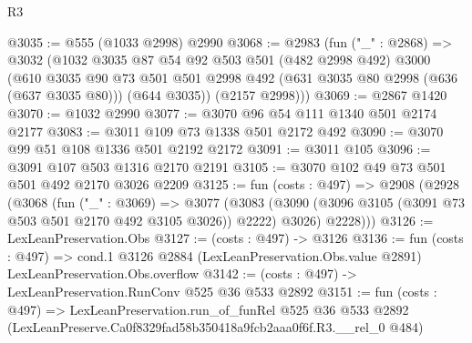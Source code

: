 \begin{lexlean}{R3}
\begin{coremodule}
@3035 := @555 (@1033 @2998) @2990
@3068 := @2983
    (fun ("_" : @2868) =>
    @3032
      (@1032
        @3035
        @87
        @54
        @92
        @503
        @501
        (@482 @2998 @492)
        @3000
        (@610
          @3035
          @90
          @73
          @501
          @501
          @2998
          @492
          (@631 @3035 @80 @2998 (@636 (@637 @3035 @80)))
          (@644 @3035))
        (@2157 @2998)))
@3069 := @2867 @1420
@3070 := @1032 @2990
@3077 := @3070 @96 @54 @111 @1340 @501 @2174 @2177
@3083 := @3011 @109 @73 @1338 @501 @2172 @492
@3090 := @3070 @99 @51 @108 @1336 @501 @2192 @2172
@3091 := @3011 @105
@3096 := @3091 @107 @503 @1316 @2170 @2191
@3105 := @3070 @102 @49 @73 @501 @501 @492 @2170 @3026 @2209
@3125 := fun (costs : @497) =>
  @2908
    (@2928
      (@3068
        (fun ("_" : @3069) =>
        @3077
          (@3083 (@3090 (@3096 @3105 (@3091 @73 @503 @501 @2170 @492 @3105 @3026)) @2222) @3026)
          @2228)))
@3126 := LexLeanPreservation.Obs
@3127 := (costs : @497) -> @3126
@3136 := fun (costs : @497) =>
  cond.{1} @3126 @2884 (LexLeanPreservation.Obs.value @2891) LexLeanPreservation.Obs.overflow
@3142 := (costs : @497) -> LexLeanPreservation.RunConv @525 @36 @533 @2892
@3151 := fun (costs : @497) =>
  LexLeanPreservation.run_of_funRel
    @525
    @36
    @533
    @2892
    (LexLeanPreserve.Ca0f8329fad58b350418a9fcb2aaa0f6f.R3.__rel_0 @484)
\end{coremodule}
\end{lexlean}
